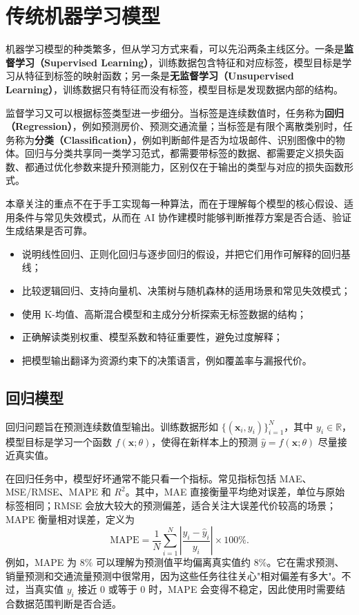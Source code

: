 \chapter{传统机器学习模型}

机器学习模型的种类繁多，但从学习方式来看，可以先沿两条主线区分。一条是\textbf{监督学习（Supervised Learning）}，训练数据包含特征和对应标签，模型目标是学习从特征到标签的映射函数；另一条是\textbf{无监督学习（Unsupervised Learning）}，训练数据只有特征而没有标签，模型目标是发现数据内部的结构。

监督学习又可以根据标签类型进一步细分。当标签是连续数值时，任务称为\textbf{回归（Regression）}，例如预测房价、预测交通流量；当标签是有限个离散类别时，任务称为\textbf{分类（Classification）}，例如判断邮件是否为垃圾邮件、识别图像中的物体。回归与分类共享同一类学习范式，都需要带标签的数据、都需要定义损失函数、都通过优化参数来提升预测能力，区别仅在于输出的类型与对应的损失函数形式。

本章关注的重点不在于手工实现每一种算法，而在于理解每个模型的核心假设、适用条件与常见失效模式，从而在 AI 协作建模时能够判断推荐方案是否合适、验证生成结果是否可靠。

\begin{chapterguide}
\begin{itemize}
  \item 说明线性回归、正则化回归与逐步回归的假设，并把它们用作可解释的回归基线；
  \item 比较逻辑回归、支持向量机、决策树与随机森林的适用场景和常见失效模式；
  \item 使用 K-均值、高斯混合模型和主成分分析探索无标签数据的结构；
  \item 正确解读类别权重、模型系数和特征重要性，避免过度解释；
  \item 把模型输出翻译为资源约束下的决策语言，例如覆盖率与漏报代价。
\end{itemize}
\end{chapterguide}

\section{回归模型}

回归问题旨在预测连续数值型输出。训练数据形如 $\{(\mathbf{x}_i, y_i)\}_{i=1}^N$，其中 $y_i \in \mathbb{R}$，模型目标是学习一个函数 $f(\mathbf{x};\theta)$，使得在新样本上的预测 $\hat{y} = f(\mathbf{x};\theta)$ 尽量接近真实值。

在回归任务中，模型好坏通常不能只看一个指标。常见指标包括 MAE、MSE/RMSE、MAPE 和 $R^2$。其中，MAE 直接衡量平均绝对误差，单位与原始标签相同；RMSE 会放大较大的预测偏差，适合关注大误差代价较高的场景；MAPE 衡量相对误差，定义为
\[
\mathrm{MAPE}=\frac{1}{N}\sum_{i=1}^{N}\left|\frac{y_i-\hat{y}_i}{y_i}\right|\times100\%.
\]
例如，MAPE 为 $8\%$ 可以理解为预测值平均偏离真实值约 $8\%$。它在需求预测、销量预测和交通流量预测中很常用，因为这些任务往往关心"相对偏差有多大"。不过，当真实值 $y_i$ 接近 0 或等于 0 时，MAPE 会变得不稳定，因此使用时需要结合数据范围判断是否合适。


